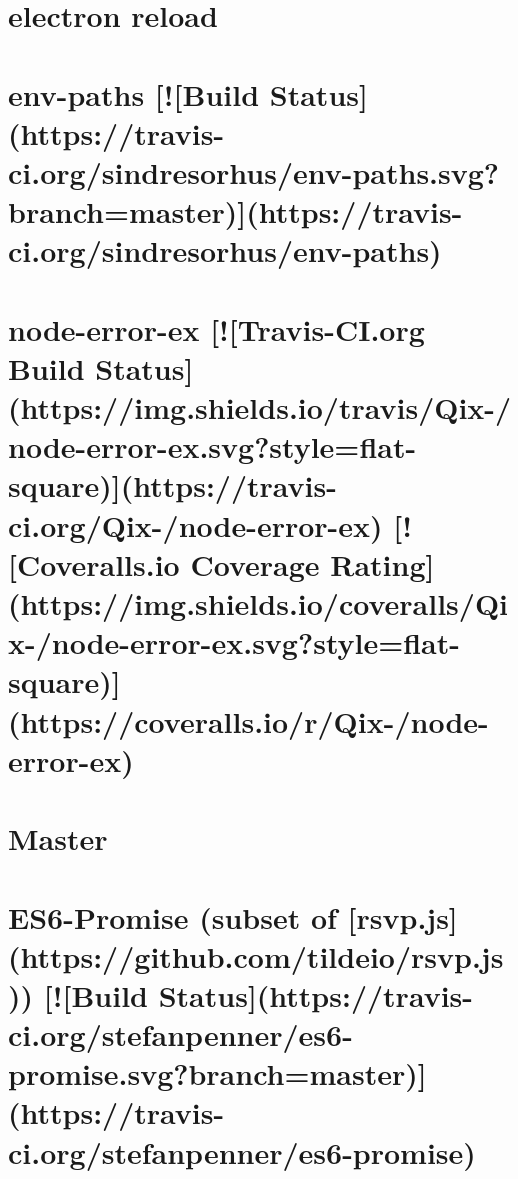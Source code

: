 \documentclass[twoside]{book}
\newcommand{\+}{\discretionary{\mbox{\scriptsize$\hookleftarrow$}}{}{}}
\begin{document}
\chapter{electron reload}
\label{md_dsmacc_vis_degree_node_modules_electron-reload_README}

\chapter{env-\/paths \mbox{[}!\mbox{[}Build Status\mbox{]}(https\+://travis-\/ci.org/sindresorhus/env-\/paths.svg?branch=master)\mbox{]}(https\+://travis-\/ci.org/sindresorhus/env-\/paths)}
\label{md_dsmacc_vis_degree_node_modules_env-paths_readme}

\chapter{node-\/error-\/ex \mbox{[}!\mbox{[}Travis-\/\+CI.org Build Status\mbox{]}(https\+://img.shields.\+io/travis/\+Qix-\//node-\/error-\/ex.svg?style=flat-\/square)\mbox{]}(https\+://travis-\/ci.org/\+Qix-\//node-\/error-\/ex) \mbox{[}!\mbox{[}Coveralls.\+io Coverage Rating\mbox{]}(https\+://img.shields.\+io/coveralls/\+Qix-\//node-\/error-\/ex.svg?style=flat-\/square)\mbox{]}(https\+://coveralls.io/r/\+Qix-\//node-\/error-\/ex)}
\label{md_dsmacc_vis_degree_node_modules_error-ex_README}

\chapter{Master}
\label{md_dsmacc_vis_degree_node_modules_es6-promise_CHANGELOG}

\chapter{E\+S6-\/\+Promise (subset of \mbox{[}rsvp.\+js\mbox{]}(https\+://github.com/tildeio/rsvp.js)) \mbox{[}!\mbox{[}Build Status\mbox{]}(https\+://travis-\/ci.org/stefanpenner/es6-\/promise.svg?branch=master)\mbox{]}(https\+://travis-\/ci.org/stefanpenner/es6-\/promise)}
\label{md_dsmacc_vis_degree_node_modules_es6-promise_README}

\end{document}

